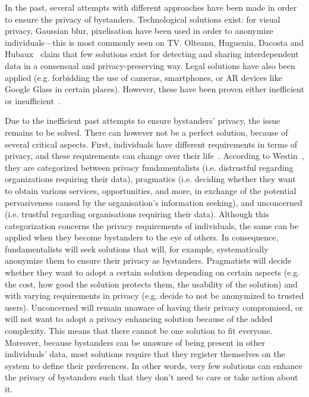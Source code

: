 \documentclass[conference]{IEEEtran}
\begin{document}
In the past, several attempts with different approaches have been made in order to ensure the privacy of bystanders. Technological solutions exist: for visual privacy, Gaussian blur, pixelisation \cite{dufaux2010framework} have been used in order to anonymize individuals---this is most commonly seen on TV. Olteanu, Huguenin, Dacosta and Hubaux~\cite{olteanu2018consensual} claim that few solutions exist for detecting and sharing interdependent data in a consensual and privacy-preserving way. Legal solutions have also been applied (e.g. forbidding the use of cameras, smartphones, or \ac{AR} devices like Google Glass in certain places\cite{shu2016cardea}). However, these have been proven either inefficient or insufficient~\cite{shu2016cardea, olteanu2018consensual, dufaux2010framework}. 

Due to the inefficient past attempts to ensure bystanders' privacy, the issue remains to be solved. There can however not be a perfect solution, because of several critical aspects. First, individuals have different requirements in terms of privacy, and these requirements can change over their life~\cite{shu2016cardea}. According to Westin~\cite{langheinrich2009privacy}, they are categorized between privacy fundamentalists (i.e. distrustful regarding organizations requiring their data), pragmatics (i.e. deciding whether they want to obtain various services, opportunities, and more, in exchange of the potential pervasiveness caused by the organisation's information seeking), and unconcerned (i.e. trustful regarding organisations requiring their data). Although this categorization concerns the privacy requirements of individuals, the same can be applied when they become bystanders to the eye of others. In consequence, fundamentalists will seek solutions that will, for example, systematically anonymize them to ensure their privacy as bystanders. Pragmatists will decide whether they want to adopt a certain solution depending on certain aspects (e.g. the cost, how good the solution protects them, the usability of the solution) and with varying requirements in privacy (e.g. decide to not be anonymized to trusted users). Unconcerned will remain unaware of having their privacy compromised, or will not want to adopt a privacy enhancing solution because of the added complexity. This means that there cannot be one solution to fit everyone. Moreover, because bystanders can be unaware of being present in other individuals' data, most solutions require that they register themselves on the system to define their preferences. In other words, very few solutions can enhance the privacy of bystanders such that they don't need to care or take action about it.
\end{document}
